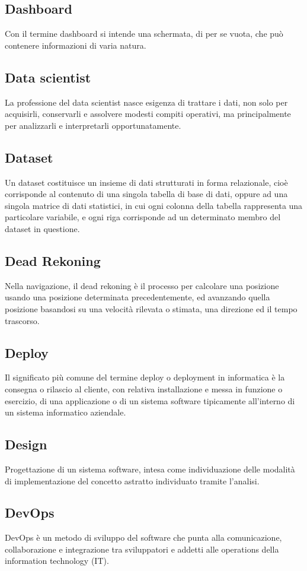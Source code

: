 \subsection{Dashboard}  Con il termine dashboard si intende una schermata, di per se vuota, che può contenere informazioni di varia natura.
\subsection{Data scientist}  La professione del data scientist nasce esigenza di trattare i dati, non solo per acquisirli, conservarli e assolvere modesti compiti operativi, ma principalmente per analizzarli e interpretarli opportunatamente.
\subsection{Dataset}  Un dataset costituisce un insieme di dati strutturati in forma relazionale, cioè corrisponde al contenuto di una singola tabella di base di dati, oppure ad una singola matrice di dati statistici, in cui ogni colonna della tabella rappresenta una particolare variabile, e ogni riga corrisponde ad un determinato membro del dataset in questione.
\subsection{Dead Rekoning}  Nella navigazione, il dead rekoning è il processo per calcolare una posizione usando una posizione determinata precedentemente, ed avanzando quella posizione basandosi su una velocità rilevata o stimata, una direzione ed il tempo trascorso.
\subsection{Deploy}  Il significato più comune del termine deploy o deployment in informatica è la consegna o rilascio al cliente, con relativa installazione e messa in funzione o esercizio, di una applicazione o di un sistema software tipicamente all'interno di un sistema informatico aziendale.
\subsection{Design}  Progettazione di un sistema software, intesa come individuazione delle modalità di implementazione del concetto astratto individuato tramite l'analisi.
\subsection{DevOps}  DevOps è un metodo di sviluppo del software che punta alla comunicazione, collaborazione e integrazione tra sviluppatori e addetti alle operations della information technology (IT).
